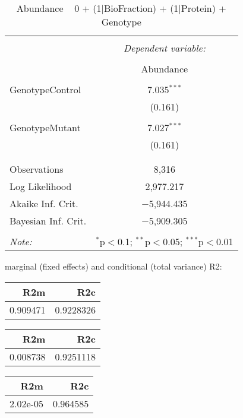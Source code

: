 \documentclass[11pt]{report}
\begin{document}
\begin{table}[!htbp] \centering 
  \caption{Abundance ~ 0 + (1|BioFraction) + (1|Protein) + Genotype} 
  \label{} 
\begin{tabular}{@{\extracolsep{5pt}}lc} 
\\[-1.8ex]\hline 
\hline \\[-1.8ex] 
 & \multicolumn{1}{c}{\textit{Dependent variable:}} \\ 
\cline{2-2} 
\\[-1.8ex] & Abundance \\ 
\hline \\[-1.8ex] 
 GenotypeControl & 7.035$^{***}$ \\ 
  & (0.161) \\ 
  & \\ 
 GenotypeMutant & 7.027$^{***}$ \\ 
  & (0.161) \\ 
  & \\ 
\hline \\[-1.8ex] 
Observations & 8,316 \\ 
Log Likelihood & 2,977.217 \\ 
Akaike Inf. Crit. & $-$5,944.435 \\ 
Bayesian Inf. Crit. & $-$5,909.305 \\ 
\hline 
\hline \\[-1.8ex] 
\textit{Note:}  & \multicolumn{1}{r}{$^{*}$p$<$0.1; $^{**}$p$<$0.05; $^{***}$p$<$0.01} \\ 
\end{tabular} 
\end{table} 
marginal (fixed effects) and conditional (total variance) R2:

\begin{tabular}{r|r}
\hline
R2m & R2c\\
\hline
0.909471 & 0.9228326\\
\hline
\end{tabular}

\begin{tabular}{r|r}
\hline
R2m & R2c\\
\hline
0.008738 & 0.9251118\\
\hline
\end{tabular}

\begin{tabular}{r|r}
\hline
R2m & R2c\\
\hline
2.02e-05 & 0.964585\\
\hline
\end{tabular}
\end{document}
